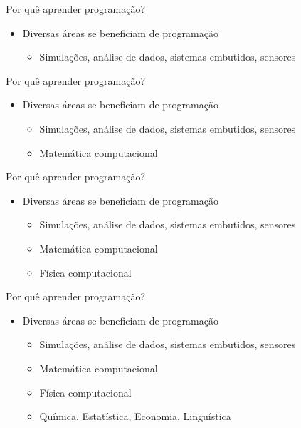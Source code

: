 \documentclass[t, aspectratio=169]{beamer}
\begin{document}
\begin{frame}[label={sec:org104785c}]{Por quê aprender programação?}
\begin{itemize}
\item Diversas áreas se beneficiam de programação
\begin{itemize}
\item Simulações, análise de dados, sistemas embutidos, sensores
\end{itemize}
\end{itemize}
\end{frame}

\begin{frame}[label={sec:org7183d81}]{Por quê aprender programação?}
\begin{itemize}
\item Diversas áreas se beneficiam de programação
\begin{itemize}
\item Simulações, análise de dados, sistemas embutidos, sensores
\item Matemática computacional
\end{itemize}
\end{itemize}
\end{frame}

\begin{frame}[label={sec:org65a1c3e}]{Por quê aprender programação?}
\begin{itemize}
\item Diversas áreas se beneficiam de programação
\begin{itemize}
\item Simulações, análise de dados, sistemas embutidos, sensores
\item Matemática computacional
\item Física computacional
\end{itemize}
\end{itemize}
\end{frame}

\begin{frame}[label={sec:orgf048633}]{Por quê aprender programação?}
\begin{itemize}
\item Diversas áreas se beneficiam de programação
\begin{itemize}
\item Simulações, análise de dados, sistemas embutidos, sensores
\item Matemática computacional
\item Física computacional
\item Química, Estatística, Economia, Linguística
\end{itemize}
\end{itemize}
\end{frame}
\end{document}
